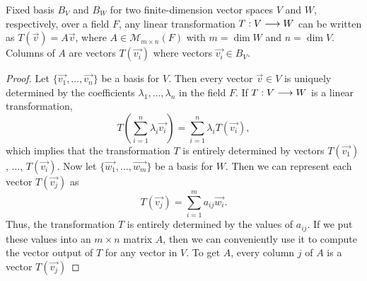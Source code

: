 

\begin{prop}
    Fixed basis $B_V$ and $B_W$ for two finite-dimension vector spaces $V$ and $W$, respectively, over a field
    $F$, any linear transformation $T : V\longrightarrow W$ can be written as $T\left( \vec{v} \right) = A\vec{v}$, where $A\in\mathcal{M}_{m\times n}\left( F\right)$
    with $m = \dim W$ and $n = \dim V$. Columns of $A$ are vectors $T\left( \vec{v_i} \right)$ where 
    vectors $\vec{v_i}\in B_V$.
\end{prop}

\begin{proof}
    Let $\{\vec{v_1}, \ldots, \vec{v_n}\} $ be a basis for $V$. Then every vector $\vec{v}\in V$ is uniquely
    determined by the coefficients $\lambda_1, \ldots, \lambda_n$ in the field $F$. If $T : V\longrightarrow W$ is
    a linear transformation,
    \begin{equation}
        T\left( \sum_{i=1}^n\lambda_i \vec{v_i} \right) = \sum_{i=1}^n\lambda_i T\left( \vec{v_i} \right), 
    \end{equation}
    which implies that the transformation $T$ is entirely determined by vectors $T\left( \vec{v_1} \right)$,
    $\ldots$, $T\left( \vec{v_i} \right) $. Now let $\{\vec{w_1}, \ldots, \vec{w_m}\} $ be a basis for $W$.
    Then we can represent each vector $T\left( \vec{v_j} \right) $ as
    \begin{equation}
        T\left( \vec{v_j} \right) = \sum_{i=1}^m a_{ij}\vec{w_i}.
    \end{equation}
    Thus, the transformation $T$ is entirely determined by the values of $a_{ij}$. If we put these values 
    into an $m\times n$ matrix $A$, then we can conveniently use it to compute the vector output of $T$ for
    any vector in $V$. To get $A$, every column $j$ of $A$ is a vector $T\left( \vec{v_j} \right) $
\end{proof}


